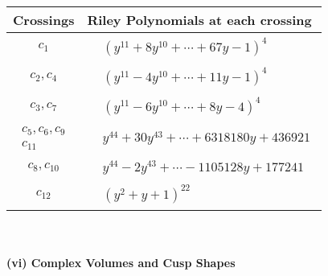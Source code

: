 \documentclass[1p]{elsarticle_modified}
\theoremstyle{definition}
\begin{document}
\begin{tabular}{m{50pt}|m{274pt}}
Crossings & \hspace{64pt}Riley Polynomials at each crossing \\
\hline $$\begin{aligned}c_{1}\end{aligned}$$&$\begin{aligned}
&(y^{11}+8 y^{10}+\cdots+67 y-1)^{4}
\end{aligned}$\\
\hline $$\begin{aligned}c_{2},c_{4}\end{aligned}$$&$\begin{aligned}
&(y^{11}-4 y^{10}+\cdots+11 y-1)^{4}
\end{aligned}$\\
\hline $$\begin{aligned}c_{3},c_{7}\end{aligned}$$&$\begin{aligned}
&(y^{11}-6 y^{10}+\cdots+8 y-4)^{4}
\end{aligned}$\\
\hline $$\begin{aligned}c_{5},c_{6},c_{9}\\c_{11}\end{aligned}$$&$\begin{aligned}
&y^{44}+30 y^{43}+\cdots+6318180 y+436921
\end{aligned}$\\
\hline $$\begin{aligned}c_{8},c_{10}\end{aligned}$$&$\begin{aligned}
&y^{44}-2 y^{43}+\cdots-1105128 y+177241
\end{aligned}$\\
\hline $$\begin{aligned}c_{12}\end{aligned}$$&$\begin{aligned}
&(y^2+y+1)^{22}
\end{aligned}$\\
\hline
\end{tabular}\\~\\
\newpage\flushleft \textbf{(vi) Complex Volumes and Cusp Shapes}
\end{document}

